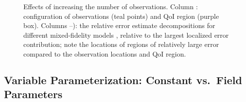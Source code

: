 \documentclass[review]{siamart0516}
\providecommand{\DIFaddtex}[1]{{\protect\color{blue} \sf #1}} %
\providecommand{\DIFaddFL}[1]{\DIFadd{#1}} %
\providecommand{\DIFaddbeginFL}{} %
\providecommand{\DIFaddendFL}{} %
\providecommand{\DIFadd}[1]{\texorpdfstring{\DIFaddtex{#1}}{#1}} %
\newcommand{\DIFaddincludegraphics}[2][]{{\color{blue}\fbox{\DIFOincludegraphics[#1]{#2}}}} %
\DeclareRobustCommand{\DIFaddbeginFL}{\DIFOaddbeginFL \let\includegraphics\DIFaddincludegraphics} %
\DeclareRobustCommand{\DIFaddendFL}{\DIFOaddendFL \let\includegraphics\DIFOincludegraphics} %
\begin{document}
\begin{figure}[htbp]
{}
\captionsetup{justification=centering}
  \DIFaddendFL \caption{Effects of increasing the number of observations. Column \protect{}: configuration of observations (teal points) and QoI region (purple box). Columns \protect{}--\protect{}): the \DIFaddbeginFL \DIFaddFL{relative }\DIFaddendFL error estimate decompositions for different mixed-fidelity models\DIFaddbeginFL \DIFaddFL{, relative to the largest localized error contribution; note the locations of regions of relatively large error compared to the observation locations and QoI region}\DIFaddendFL .}
  \label{fig:dataStudy}
\end{figure}

\subsection{Variable Parameterization: Constant vs.\ Field Parameters} \label{sec:constvfield}
\end{document}
